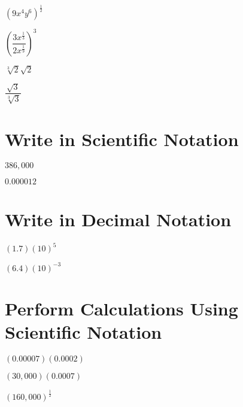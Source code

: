 \documentclass[fleqn,addpoints]{exam}
\begin{document}
\begin{questions}
\question \( (9x^4y^6)^{\frac{1}{2}}\) 
\vspace{0.5 cm}

\question \( \left( \dfrac{3x^\frac{1}{3}}{2x^{\frac{1}{9}}} \right)^3\) 
\vspace{0.5 cm}

\question \( \sqrt[3]{2} \sqrt{2} \) 
\vspace{0.5 cm}

\question \( \dfrac{\sqrt{3}}{\sqrt[3]{3}} \) 
\vspace{0.5 cm}

\section{Write in Scientific Notation}
\question \( 386,000 \) 
\vspace{0.5 cm}

\question \( 0.000012 \) 
\vspace{0.5 cm}

\section{Write in Decimal Notation}
\question \( (1.7)(10)^5 \) 
\vspace{0.5 cm}

\question \( (6.4)(10)^{-3} \) 
\vspace{0.5 cm}

\section{Perform Calculations Using Scientific Notation }

\question \( (0.00007) (0.0002) \) 
\vspace{0.5 cm}

\question \( (30,000) (0.0007) \) 
\vspace{0.5 cm}

\question \( (160,000)^{\frac{1}{2}} \) 
\vspace{0.5 cm}


\end{questions}
\end{document}
